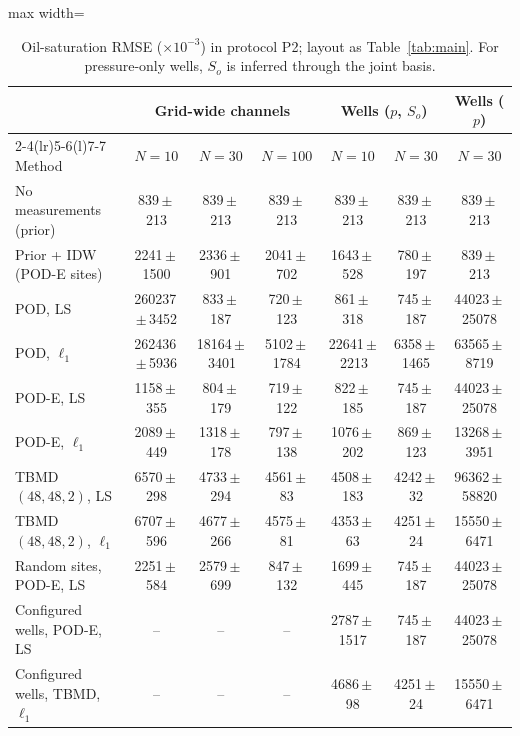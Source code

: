 \begin{table}[tbp]
\centering
\scriptsize
\setlength{\tabcolsep}{2.5pt}
\caption{Oil-saturation RMSE ($\times10^{-3}$) in protocol P2; layout as Table~\ref{tab:main}. For pressure-only wells, $S_o$ is inferred through the joint basis.}
\label{tab:S_So}
\begin{adjustbox}{max width=\linewidth}
\begin{tabular}{@{}lcccccc@{}}
\toprule
 & \multicolumn{3}{c}{Grid-wide channels} & \multicolumn{2}{c}{Wells ($p$, $S_o$)} & Wells ($p$) \\
\cmidrule(lr){2-4}\cmidrule(lr){5-6}\cmidrule(l){7-7}
Method & $N=10$ & $N=30$ & $N=100$ & $N=10$ & $N=30$ & $N=30$ \\
\midrule
No measurements (prior) & 839\,$\pm$\,213 & 839\,$\pm$\,213 & 839\,$\pm$\,213 & 839\,$\pm$\,213 & 839\,$\pm$\,213 & 839\,$\pm$\,213 \\
Prior + IDW (POD-E sites) & 2241\,$\pm$\,1500 & 2336\,$\pm$\,901 & 2041\,$\pm$\,702 & 1643\,$\pm$\,528 & 780\,$\pm$\,197 & 839\,$\pm$\,213 \\
POD, LS & 260237\,$\pm$\,3452 & 833\,$\pm$\,187 & 720\,$\pm$\,123 & 861\,$\pm$\,318 & 745\,$\pm$\,187 & 44023\,$\pm$\,25078 \\
POD, $\ell_1$ & 262436\,$\pm$\,5936 & 18164\,$\pm$\,3401 & 5102\,$\pm$\,1784 & 22641\,$\pm$\,2213 & 6358\,$\pm$\,1465 & 63565\,$\pm$\,8719 \\
POD-E, LS & 1158\,$\pm$\,355 & 804\,$\pm$\,179 & 719\,$\pm$\,122 & 822\,$\pm$\,185 & 745\,$\pm$\,187 & 44023\,$\pm$\,25078 \\
POD-E, $\ell_1$ & 2089\,$\pm$\,449 & 1318\,$\pm$\,178 & 797\,$\pm$\,138 & 1076\,$\pm$\,202 & 869\,$\pm$\,123 & 13268\,$\pm$\,3951 \\
TBMD $(48,48,2)$, LS & 6570\,$\pm$\,298 & 4733\,$\pm$\,294 & 4561\,$\pm$\,83 & 4508\,$\pm$\,183 & 4242\,$\pm$\,32 & 96362\,$\pm$\,58820 \\
TBMD $(48,48,2)$, $\ell_1$ & 6707\,$\pm$\,596 & 4677\,$\pm$\,266 & 4575\,$\pm$\,81 & 4353\,$\pm$\,63 & 4251\,$\pm$\,24 & 15550\,$\pm$\,6471 \\
Random sites, POD-E, LS & 2251\,$\pm$\,584 & 2579\,$\pm$\,699 & 847\,$\pm$\,132 & 1699\,$\pm$\,445 & 745\,$\pm$\,187 & 44023\,$\pm$\,25078 \\
Configured wells, POD-E, LS & -- & -- & -- & 2787\,$\pm$\,1517 & 745\,$\pm$\,187 & 44023\,$\pm$\,25078 \\
Configured wells, TBMD, $\ell_1$ & -- & -- & -- & 4686\,$\pm$\,98 & 4251\,$\pm$\,24 & 15550\,$\pm$\,6471 \\
\bottomrule
\end{tabular}
\end{adjustbox}
\end{table}
